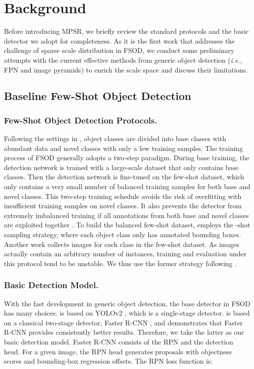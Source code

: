 \documentclass[runningheads]{llncs}
\begin{document}
\section{Background}
Before introducing MPSR, we briefly review the standard protocols and the basic detector we adopt for completeness. As it is the first work that addresses the challenge of sparse scale distribution in FSOD, we conduct some preliminary attempts with the current effective methods from generic object detection (\emph{i.e.}, FPN and image pyramids) to enrich the scale space and discuss their limitations.

\subsection{Baseline Few-Shot Object Detection}

\subsubsection{Few-Shot Object Detection Protocols.}
Following the settings in \cite{yolore,metarcnn}, object classes are divided into base classes with abundant data and novel classes with only a few training samples.
The training process of FSOD generally adopts a two-step paradigm. During base training, the detection network is trained with a large-scale dataset that only contains base classes. 
Then the detection network is fine-tuned on the few-shot dataset, which only contains a very small number of balanced  training samples for both base and novel classes.
This two-step training schedule avoids the risk of overfitting with insufficient training samples on novel classes. 
It also prevents the detector from extremely imbalanced training if all annotations from both base and novel classes are exploited together \cite{metarcnn}.
To build the balanced few-shot dataset, \cite{yolore} employs the -shot sampling strategy, where each object class only has  annotated bounding boxes.
Another work \cite{lstd} collects  images for each class in the few-shot dataset. 
As  images actually contain an arbitrary number of instances, training and evaluation under this protocol tend to be unstable. 
We thus use the former strategy following \cite{yolore}.

\subsubsection{Basic Detection Model.}
With the fast development in generic object detection, the base detector in FSOD has many choices.
\cite{yolore} is based on YOLOv2 \cite{yolov2}, which is a single-stage 
detector.
\cite{metarcnn} is based on a classical two-stage detector, Faster R-CNN \cite{fasterrcnn}, and demonstrates that Faster R-CNN provides consistently better results.
Therefore, we take the latter as our basic detection model.
Faster R-CNN consists of the RPN and the detection head.
For a given image, the RPN head generates proposals with objectness scores and bounding-box regression offsets. 
The RPN loss function is:
\end{document}
